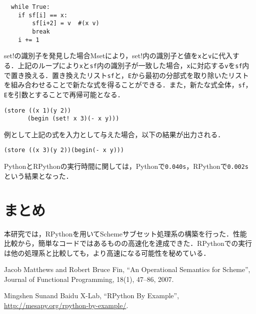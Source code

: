 \documentclass[twocolumn]{jsarticle}
\begin{document}
\begin{verbatim}
  while True:
    if sf[i] == x:
        sf[i+2] = v  #(x v)
        break
    i += 1
\end{verbatim}

\noindent
set!の識別子を発見した場合Msetにより，set!内の識別子と値を\verb|x|と\verb|v|に代入する．上記のループにより\verb|x|と\verb|sf|内の識別子が一致した場合，\verb|x|に対応する\verb|v|を\verb|sf|内で置き換える．置き換えたリスト\verb|sf|と，\verb|E|から最初の分部式を取り除いたリストを組み合わせることで新たな式を得ることができる．また，新たな式全体，\verb|sf|，\verb|E|を引数とすることで再帰可能となる．


\begin{verbatim}
(store ((x 1)(y 2))
　　　　(begin (set! x 3)(- x y)))
\end{verbatim}

例として上記の式を入力として与えた場合，以下の結果が出力される．

\begin{verbatim}
(store ((x 3)(y 2))(begin(- x y)))
\end{verbatim}


\noindent
PythonとRPythonの実行時間に関しては，Pythonで\verb|0.040s|，RPythonで\verb|0.002s|という結果となった．

\section{まとめ}

 本研究では，RPythonを用いてSchemeサブセット処理系の構築を行った．性能比較から，簡単なコードではあるものの高速化を達成できた．RPythonでの実行は他の処理系と比較しても，より高速になる可能性を秘めている．


\begin{thebibliography}{99}

 Jacob Matthews and Robert Bruce Fin, ``An Operational Semantics for Scheme'', Journal of Functional Programming, 18(1), 47--86, 2007.

Mingshen Sunand Baidu X-Lab, ``RPython By Example'', \url{http://mesapy.org/rpython-by-example/}.

\end{thebibliography}
\end{document}
